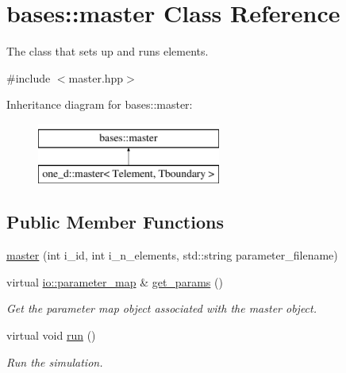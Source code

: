 \hypertarget{classbases_1_1master}{\section{bases\-:\-:master Class Reference}
\label{classbases_1_1master}
}


The class that sets up and runs elements.  




{\ttfamily \#include $<$master.\-hpp$>$}

Inheritance diagram for bases\-:\-:master\-:\begin{figure}[H]
\begin{center}
\leavevmode
\includegraphics[height=2.000000cm]{classbases_1_1master}
\end{center}
\end{figure}
\subsection*{Public Member Functions}
\begin{DoxyCompactItemize}
\item 
\hyperlink{classbases_1_1master_a72c95fc1daa30b3109c056036cef488b}{master} (int i\-\_\-id, int i\-\_\-n\-\_\-elements, std\-::string parameter\-\_\-filename)
\item 
virtual \hyperlink{namespaceio_a1c55c654666eeece6a9724f453fdbd87}{io\-::parameter\-\_\-map} \& \hyperlink{classbases_1_1master_ae2abaf645c0749f29cb76f3d9628aaa3}{get\-\_\-params} ()
\begin{DoxyCompactList}\small\item\em Get the parameter map object associated with the master object. \end{DoxyCompactList}\item 
virtual void \hyperlink{classbases_1_1master_a1b04748fd9da5863c4063184c135e8e5}{run} ()
\begin{DoxyCompactList}\small\item\em Run the simulation. \end{DoxyCompactList}\end{DoxyCompactItemize}
